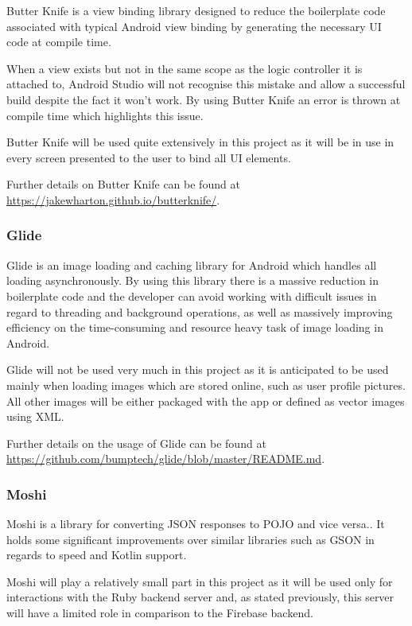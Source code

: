 Butter Knife is a view binding library designed to reduce the boilerplate code associated with typical Android view binding by generating the necessary UI code at compile time\cite{butterknife}.

When a view exists but not in the same scope as the logic controller it is attached to, Android Studio will not recognise this mistake and allow a successful build despite the fact it won't work. By using Butter Knife an error is thrown at compile time which highlights this issue.

Butter Knife will be used quite extensively in this project as it will be in use in every screen presented to the user to bind all UI elements.

Further details on Butter Knife can be found at \url{https://jakewharton.github.io/butterknife/}.

\subsubsection{Glide}

Glide is an image loading and caching library for Android which handles all loading asynchronously. By using this library there is a massive reduction in boilerplate code and the developer can avoid working with difficult issues in regard to threading and background operations, as well as massively improving efficiency on the time-consuming and resource heavy task of image loading in Android.

Glide will not be used very much in this project as it is anticipated to be used mainly when loading images which are stored online, such as user profile pictures. All other images will be either packaged with the app or defined as vector images using XML.

Further details on the usage of Glide can be found at \url{https://github.com/bumptech/glide/blob/master/README.md}.

\subsubsection{Moshi}

Moshi is a library for converting JSON responses to POJO and vice versa.\cite{moshi}. It holds some significant improvements over similar libraries such as GSON in regards to speed and Kotlin support\cite{moshibettergson}.

Moshi will play a relatively small part in this project as it will be used only for interactions with the Ruby backend server and, as stated previously, this server will have a limited role in comparison to the Firebase backend.

